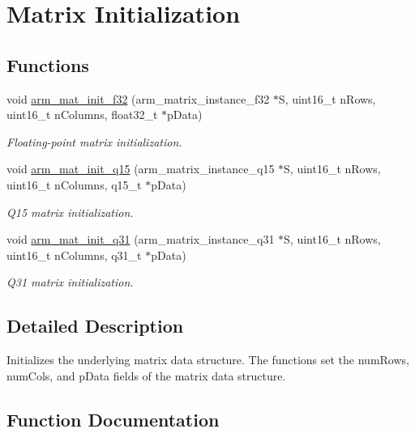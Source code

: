 \hypertarget{group__MatrixInit}{}\section{Matrix Initialization}
\label{group__MatrixInit}
\subsection*{Functions}
\begin{DoxyCompactItemize}
\item 
void \hyperlink{group__MatrixInit_ga11e3dc41592a6401c13182fef9416a27}{arm\+\_\+mat\+\_\+init\+\_\+f32} (arm\+\_\+matrix\+\_\+instance\+\_\+f32 $\ast$S, uint16\+\_\+t n\+Rows, uint16\+\_\+t n\+Columns, float32\+\_\+t $\ast$p\+Data)
\begin{DoxyCompactList}\small\item\em Floating-\/point matrix initialization. \end{DoxyCompactList}\item 
void \hyperlink{group__MatrixInit_ga31a7c2b991803d49719393eb2d53dc26}{arm\+\_\+mat\+\_\+init\+\_\+q15} (arm\+\_\+matrix\+\_\+instance\+\_\+q15 $\ast$S, uint16\+\_\+t n\+Rows, uint16\+\_\+t n\+Columns, q15\+\_\+t $\ast$p\+Data)
\begin{DoxyCompactList}\small\item\em Q15 matrix initialization. \end{DoxyCompactList}\item 
void \hyperlink{group__MatrixInit_ga48a5e5d37e1f062cc57fcfaf683343cc}{arm\+\_\+mat\+\_\+init\+\_\+q31} (arm\+\_\+matrix\+\_\+instance\+\_\+q31 $\ast$S, uint16\+\_\+t n\+Rows, uint16\+\_\+t n\+Columns, q31\+\_\+t $\ast$p\+Data)
\begin{DoxyCompactList}\small\item\em Q31 matrix initialization. \end{DoxyCompactList}\end{DoxyCompactItemize}


\subsection{Detailed Description}
Initializes the underlying matrix data structure. The functions set the {\ttfamily num\+Rows}, {\ttfamily num\+Cols}, and {\ttfamily p\+Data} fields of the matrix data structure. 

\subsection{Function Documentation}

